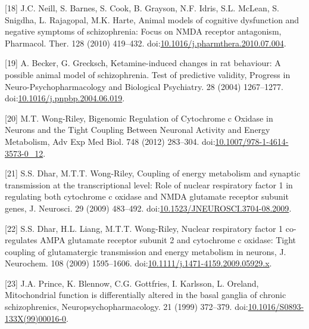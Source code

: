 \documentclass[man]{apa6}
\begin{document}
\leavevmode\hypertarget{ref-neillAnimalModelsCognitive2010}{}%
{[}18{]} J.C. Neill, S. Barnes, S. Cook, B. Grayson, N.F. Idris, S.L. McLean, S. Snigdha, L. Rajagopal, M.K. Harte, Animal models of cognitive dysfunction and negative symptoms of schizophrenia: Focus on NMDA receptor antagonism, Pharmacol. Ther. 128 (2010) 419--432. doi:\href{https://doi.org/10.1016/j.pharmthera.2010.07.004}{10.1016/j.pharmthera.2010.07.004}.

\leavevmode\hypertarget{ref-beckerKetamineinducedChangesRat2004}{}%
{[}19{]} A. Becker, G. Grecksch, Ketamine-induced changes in rat behaviour: A possible animal model of schizophrenia. Test of predictive validity, Progress in Neuro-Psychopharmacology and Biological Psychiatry. 28 (2004) 1267--1277. doi:\href{https://doi.org/10.1016/j.pnpbp.2004.06.019}{10.1016/j.pnpbp.2004.06.019}.

\leavevmode\hypertarget{ref-wong-rileyBigenomicRegulationCytochrome2012}{}%
{[}20{]} M.T. Wong-Riley, Bigenomic Regulation of Cytochrome c Oxidase in Neurons and the Tight Coupling Between Neuronal Activity and Energy Metabolism, Adv Exp Med Biol. 748 (2012) 283--304. doi:\href{https://doi.org/10.1007/978-1-4614-3573-0_12}{10.1007/978-1-4614-3573-0\_12}.

\leavevmode\hypertarget{ref-dharCouplingEnergyMetabolism2009}{}%
{[}21{]} S.S. Dhar, M.T.T. Wong-Riley, Coupling of energy metabolism and synaptic transmission at the transcriptional level: Role of nuclear respiratory factor 1 in regulating both cytochrome c oxidase and NMDA glutamate receptor subunit genes, J. Neurosci. 29 (2009) 483--492. doi:\href{https://doi.org/10.1523/JNEUROSCI.3704-08.2009}{10.1523/JNEUROSCI.3704-08.2009}.

\leavevmode\hypertarget{ref-dharNuclearRespiratoryFactor2009}{}%
{[}22{]} S.S. Dhar, H.L. Liang, M.T.T. Wong-Riley, Nuclear respiratory factor 1 co-regulates AMPA glutamate receptor subunit 2 and cytochrome c oxidase: Tight coupling of glutamatergic transmission and energy metabolism in neurons, J. Neurochem. 108 (2009) 1595--1606. doi:\href{https://doi.org/10.1111/j.1471-4159.2009.05929.x}{10.1111/j.1471-4159.2009.05929.x}.

\leavevmode\hypertarget{ref-princeMitochondrialFunctionDifferentially1999}{}%
{[}23{]} J.A. Prince, K. Blennow, C.G. Gottfries, I. Karlsson, L. Oreland, Mitochondrial function is differentially altered in the basal ganglia of chronic schizophrenics, Neuropsychopharmacology. 21 (1999) 372--379. doi:\href{https://doi.org/10.1016/S0893-133X(99)00016-0}{10.1016/S0893-133X(99)00016-0}.
\end{document}
